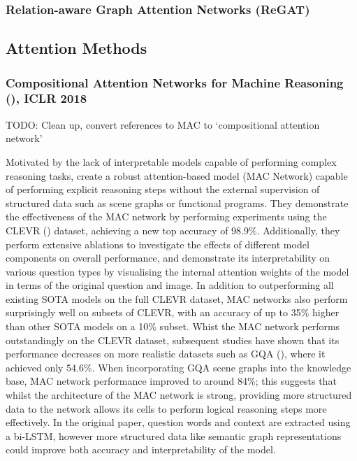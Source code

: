 \subsubsection{Relation-aware Graph Attention Networks (ReGAT)}

\subsection{Attention Methods}







\subsubsection*{Compositional Attention Networks for Machine Reasoning (\cite{hudson2018compositional}), ICLR 2018}

{\color{red} TODO: Clean up, convert references to MAC to `compositional attention network'}

Motivated by the lack of interpretable models capable of performing complex reasoning tasks, \citeauthor{hudson2018compositional} create a robust attention-based model (MAC Network) capable of performing explicit reasoning steps without the external supervision of structured data such as scene graphs or functional programs. They demonstrate the effectiveness of the MAC network by performing experiments using the CLEVR (\cite{johnson2017clevr}) dataset, achieving a new top accuracy of 98.9\%. Additionally, they perform extensive ablations to investigate the effects of different model components on overall performance, and demonstrate its interpretability on various question types by visualising the internal attention weights of the model in terms of the original question and image. In addition to outperforming all existing SOTA models on the full CLEVR dataset, MAC networks also perform surprisingly well on subsets of CLEVR, with an accuracy of up to 35\% higher than other SOTA models on a 10\% subset. Whist the MAC network performs outstandingly on the CLEVR dataset, subsequent studies have shown that its performance decreases on more realistic datasets such as GQA (\cite{hudson2019gqa}), where it achieved only 54.6\%. When incorporating GQA scene graphs into the knowledge base, MAC network performance improved to around 84\%; this suggests that whilst the architecture of the MAC network is strong, providing more structured data to the network allows its cells to perform logical reasoning steps more effectively. In the original paper, question words and context are extracted using a bi-LSTM, however more structured data like semantic graph representations could improve both accuracy and interpretability of the model.


